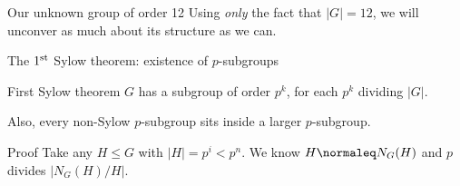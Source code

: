 \documentclass[8pt, handout]{beamer}
\newcommand{\Pause}{}      %
\begin{document}
\begin{frame}{Our unknown group of order 12}
  Using \emph{only} the fact that $|G|=12$, we will unconver
  as much about its structure as we can. 
  
\end{frame}


\begin{frame}{The $1^{\rm st}$ Sylow theorem: existence of $p$-subgroups}
  
  \begin{block}{First Sylow theorem} 
    $G$ has a subgroup of order $p^k$, for each $p^k$ dividing
    $|G|$. \medskip
    
    Also, every non-Sylow $p$-subgroup sits inside a larger
    $p$-subgroup.
  \end{block}
  
  \begin{exampleblock}{Proof} \Pause
    Take any $H\leq G$ with $|H|=p^i<p^n$. \Pause We know $H\normaleq
    N_G(H)$ and $p$ divides $|N_G(H)/H|$. \medskip\Pause
    

\end{exampleblock}
\end{frame}
\end{document}
